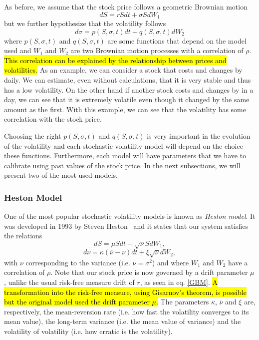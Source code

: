 As before, we assume that the stock price follows a geometric Brownian motion
\begin{equation}
dS=rSdt+\sigma SdW_1
\end{equation}
\noindent but we further hypothesize that the volatility follows
\begin{equation}
d\sigma=p(S,\sigma,t)dt+q(S,\sigma,t)dW_2
\end{equation}
\noindent where $p(S,\sigma,t)$ and $q(S,\sigma,t)$ are some functions that depend on the model used and $W_1$ and $W_2$ are two Brownian motion processes with a correlation of $\rho$. 
\hl{This correlation can be explained by the relationship between prices and volatilities.} As an example, we can consider a stock that costs  and changes by  daily. We can estimate, even without calculations, that it is very stable and thus has a low volatility.
On the other hand if another stock costs  and changes by  in a day, we can see that it is extremely volatile even though it changed by the same amount as the first. With this example, we can see that the volatility has some correlation with the stock price.

Choosing the right $p(S,\sigma,t)$ and $q(S,\sigma,t)$ is very important in the evolution of the volatility and each stochastic volatility model will depend on the choice these functions. Furthermore, each model will have parameters that we have to calibrate using past values of the stock price. In the next subsections, we will present two of the most used models.



\subsubsection{Heston Model}
One of the most popular stochastic volatility models is known as \emph{Heston model}. It was developed in 1993 by Steven Heston~\cite{Heston} and it states that our system satisfies the relations
\begin{equation}
dS=\mu Sdt+\sqrt{\nu}SdW_1,
\end{equation}
\begin{equation}
d\nu=\kappa(\overline{\nu}-\nu)dt+\xi\sqrt{\nu}dW_2,
\end{equation}
\noindent with $\nu$ corresponding to the variance (i.e. $\nu=\sigma^2$) and where $W_1$ and $W_2$ have a correlation of $\rho$. Note that our stock price is now governed by a drift parameter $\mu$, unlike the usual risk-free measure drift of $r$, as seen in eq. \eqref{GBM}. \hl{A transformation into the risk-free measure, using Gisarnov's theorem, is possible but the original model used the drift parameter $\mu$.}
The parameters $\kappa$, $\overline{\nu}$ and $\xi$ are, respectively, the mean-reversion rate (i.e. how fast the volatility converges to its mean value), the long-term variance (i.e. the mean value of variance) and the volatility of volatility (i.e. how erratic is the volatility).

